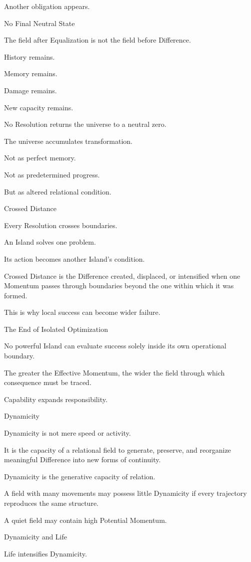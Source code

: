Another obligation appears.

No Final Neutral State

The field after Equalization is not the field before Difference.

History remains.

Memory remains.

Damage remains.

New capacity remains.

No Resolution returns the universe to a neutral zero.

The universe accumulates transformation.

Not as perfect memory.

Not as predetermined progress.

But as altered relational condition.

Crossed Distance

Every Resolution crosses boundaries.

An Island solves one problem.

Its action becomes another Island’s condition.

Crossed Distance is the Difference created, displaced, or intensified when one Momentum passes through boundaries beyond the one within which it was formed.

This is why local success can become wider failure.

The End of Isolated Optimization

No powerful Island can evaluate success solely inside its own operational boundary.

The greater the Effective Momentum, the wider the field through which consequence must be traced.

Capability expands responsibility.

Dynamicity

Dynamicity is not mere speed or activity.

It is the capacity of a relational field to generate, preserve, and reorganize meaningful Difference into new forms of continuity.

Dynamicity is the generative capacity of relation.

A field with many movements may possess little Dynamicity if every trajectory reproduces the same structure.

A quiet field may contain high Potential Momentum.

Dynamicity and Life

Life intensifies Dynamicity.

